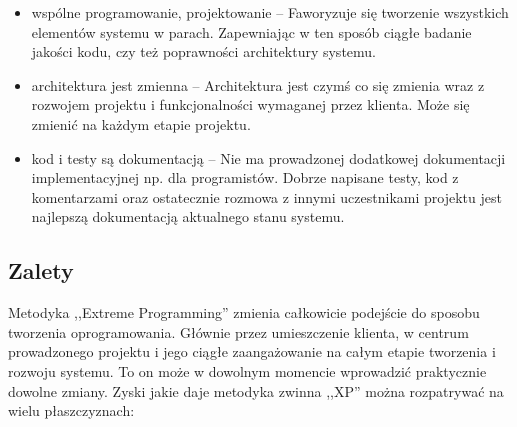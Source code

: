 \begin{itemize}
    \item wspólne programowanie, projektowanie -- Faworyzuje się tworzenie wszystkich elementów systemu w parach. Zapewniając w ten sposób ciągłe badanie jakości kodu, czy też poprawności architektury systemu.
    \item architektura jest zmienna -- Architektura jest czymś co się zmienia wraz z rozwojem projektu i funkcjonalności wymaganej przez klienta. Może się zmienić na każdym etapie projektu.
    \item kod i testy są dokumentacją -- Nie ma prowadzonej dodatkowej dokumentacji implementacyjnej np. dla programistów. Dobrze napisane testy, kod z komentarzami oraz ostatecznie rozmowa z innymi uczestnikami projektu jest najlepszą dokumentacją aktualnego stanu systemu.
\end{itemize}

\subsection{Zalety}
\label{sec:ZMTOzalety}

Metodyka ,,Extreme Programming'' zmienia całkowicie podejście do sposobu tworzenia oprogramowania. Głównie przez umieszczenie klienta, w centrum prowadzonego projektu i jego ciągłe zaangażowanie na całym etapie tworzenia i rozwoju systemu. To on może w dowolnym momencie wprowadzić praktycznie dowolne zmiany. Zyski jakie daje metodyka zwinna ,,XP'' można rozpatrywać na wielu płaszczyznach:

